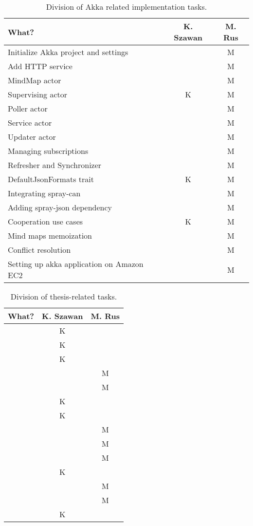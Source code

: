 \begin{table}[h]
	\centering
	\begin{tabular}{l|c|c}
		What? & K. Szawan & M. Rus \\
		\hline
		Initialize Akka project and settings & & M\\
		Add HTTP service &  & M\\
		MindMap actor & & M\\
		Supervising actor & K & M\\
		Poller actor &  & M\\
		Service actor &  & M\\
		Updater actor &  & M\\
		Managing subscriptions &  & M\\
		Refresher and Synchronizer &  & M\\
		DefaultJsonFormats trait & K & M\\
		Integrating spray-can &  & M\\
		Adding spray-json dependency &  & M\\
		Cooperation use cases & K & M\\ 
		Mind maps memoization &  & M\\
		Conflict resolution &  & M\\
		Setting up akka application on Amazon EC2 &  & M\\
	\end{tabular}
	\caption{Division of Akka related implementation tasks.}
	\label{tab:who-did-impl}
\end{table}


\begin{table}[h]
	\centering
	\begin{tabular}{l|c|c}
		What? & K. Szawan & M. Rus \\
		\hline
		\Cref{chap:introduction} & K & \\
		\Cref{sec:xmind} & K & \\
		\Cref{sec:android-theory} & K & \\
		\Cref{sec:scala} &  & M \\
		\Cref{sec:akka} &  & M \\
		\Cref{sec:requirements} & K  &  \\
		\Cref{sec:plan}  & K &  \\
		\Cref{subsec:component-android} &   & M \\
		\Cref{subsec:component-akka}   &   & M \\
		\Cref{subsec:data-repr}  &   & M \\
		\Cref{subsec:xmind-exchange}  & K  &  \\
		\Cref{subsec:android-akka-comm}  &   & M \\
		\Cref{subsec:subtree-recreation}  &   & M \\		
		\Cref{subsec:ui-mockups}  & K  &  \\
	\end{tabular}
	\caption{Division of thesis-related tasks.}
	\label{tab:who-did-docs}
\end{table}
